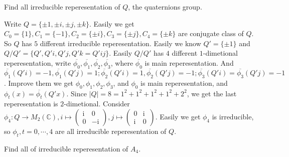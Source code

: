 \documentclass{ctexart}
\begin{document}
\begin{problem}
  Find all irreducible reperesentation of \(Q\), the quaternions group. 
\end{problem}

\begin{solution}
  Write \(Q=\{\pm 1,\pm i,\pm j,\pm k\}\). Easily we get \(C_0=\{1\},C_1=\{- 1\},C_2=\{\pm i\},C_3=\{\pm j\},C_4=\{\pm k\}\) are conjugate class of \(Q\). 
  So \(Q\) has \(5\) different irreducible reperesentation. 
  Easily we know \(Q'=\{\pm 1\}\) and \(Q / Q'=\{Q',Q'i,Q'j,Q'k=Q'ij\}\). 
  Easily \(Q / Q'\) has \(4\) different \(1\)-dimetional reperesentation, write \(\overline{\phi_0},\overline{\phi_1},\overline{\phi_2},\overline{\phi_3}\), where \(\overline{\phi_0}\) is main reperesentation.
  And \(\overline{\phi_1}(Q'i)=-1,\overline{\phi_1}(Q'j)=1;\overline{\phi_2}(Q'i)=1,\overline{\phi_2}(Q'j)=-1;\overline{\phi_3}(Q'i)=\overline{\phi_3}(Q'j)=-1\). 
  Improve them we get \(\phi_0,\phi_1,\phi_2,\phi_3\), and \(\phi_0\) is main reperesentation, and 
  \(\phi_t(x)=\overline{\phi_t}(Q'x)\). 
  Since \(|Q|=8=1^2+1^2+1^2+1^2+2^2\), we get the last reperesentation is \(2\)-dimetional. 
  Consider \(\phi_4:Q \to M_2(\mathbb{C}),i \mapsto \begin{pmatrix}
    \mathrm{i} & 0 \\ 
    0 & -\mathrm{i}
  \end{pmatrix}, j \mapsto \begin{pmatrix}
    0 & \mathrm{i} \\
    \mathrm{i} & 0
  \end{pmatrix}\). 
  Easily we get \(\phi_4\) is irreducible, so \(\phi_t,t=0,\cdots,4\) are all irreducible reperesentation of \(Q\). 
\end{solution}

\begin{problem}
  Find all of irreducible reperesentation of \(A_4\). 
\end{problem}
\end{document}
